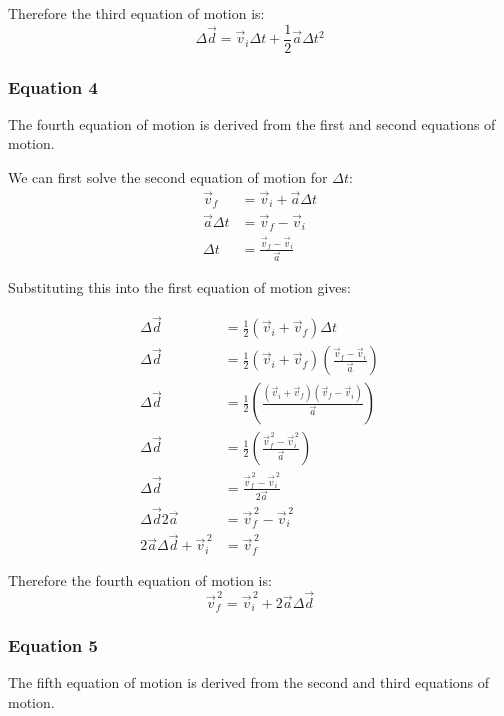 \documentclass{article}
\begin{document}
Therefore the third equation of motion is:
\begin{equation}
    \Delta \vec{d} = \vec{v}_i\Delta t + \frac{1}{2}\vec{a}\Delta t^2
\end{equation}

\subsubsection{Equation 4}
The fourth equation of motion is derived from the first and second equations of motion.

We can first solve the second equation of motion for $\Delta t$:
\begin{align}
    \vec{v}_f &= \vec{v}_i + \vec{a}\Delta t\\
    \vec{a}\Delta t &= \vec{v}_f - \vec{v}_i\\
    \Delta t &= \frac{\vec{v}_f - \vec{v}_i}{\vec{a}}
\end{align}

Substituting this into the first equation of motion gives:

\begin{align}
    \Delta \vec{d} &= \frac{1}{2}(\vec{v}_i + \vec{v}_f)\Delta t\\
    \Delta \vec{d} &= \frac{1}{2}(\vec{v}_i + \vec{v}_f)\left(\frac{\vec{v}_f - \vec{v}_i}{\vec{a}}\right)\\
    \Delta \vec{d} &= \frac{1}{2}\left(\frac{(\vec{v}_i + \vec{v}_f)(\vec{v}_f - \vec{v}_i)}{\vec{a}}\right)\\
    \Delta \vec{d} &= \frac{1}{2}\left(\frac{\vec{v}_f^{\,2} - \vec{v}_i^{\,2}}{\vec{a}}\right) \\ %
    \Delta \vec{d} &= \frac{\vec{v}_f^{\,2} - \vec{v}_i^{\,2}}{2\vec{a}} \\
    \Delta \vec{d} 2\vec{a} &= \vec{v}_f^{\,2} - \vec{v}_i^{\,2} \\
    2\vec{a}\Delta \vec{d} + \vec{v}_i^{\,2} &= \vec{v}_f^{\,2}  
\end{align}

Therefore the fourth equation of motion is:
\begin{equation}
    \vec{v}_f^{\,2} = \vec{v}_i^{\,2} + 2\vec{a}\Delta \vec{d}
\end{equation}


\subsubsection{Equation 5}
The fifth equation of motion is derived from the second and third equations of motion.
\end{document}

